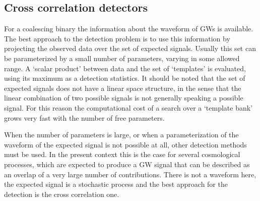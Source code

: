 \documentclass[11pt,a4paper]{article}
\newcommand{\centered}[1]{\begin{tabular}{l} #1 \end{tabular}}
\begin{document}
\begin{table}[!htbp]
\caption{\label{tab:SummarySensitivity} Summary of existing and proposed detectors with their respective sensitivities. See Sec.~\ref{sec:SummarySensitivities} for details.}
\end{table}






\subsection{Cross correlation detectors}
\label{sec:crosscorrelation}


For a coalescing binary the information about the waveform of GWs is available. The best approach to the detection problem is to use this information by projecting the observed data over the set of expected signals. Usually this set can be parameterized by a small number of parameters, varying in some allowed range. A `scalar product' between data and the set of `templates' is evaluated, using its maximum as a detection statistics.
%
It should be noted that the set of expected signals does not have a linear space structure, in the sense that the linear combination of two possible signals is not generally speaking a possible signal. For this reason the computational cost of a search over a `template bank' grows very fast with the number of free parameters.

When the number of parameters is large, or when a parameterization of the waveform of the expected signal is not possible at all, other detection methods must be used. In the present context this is the case for several cosmological processes, which are expected to produce a GW signal that can be described as an overlap of a very large number of contributions. There is not a waveform here, the expected signal is a stochastic process and the best approach for the detection is the cross correlation one.
\end{document}
